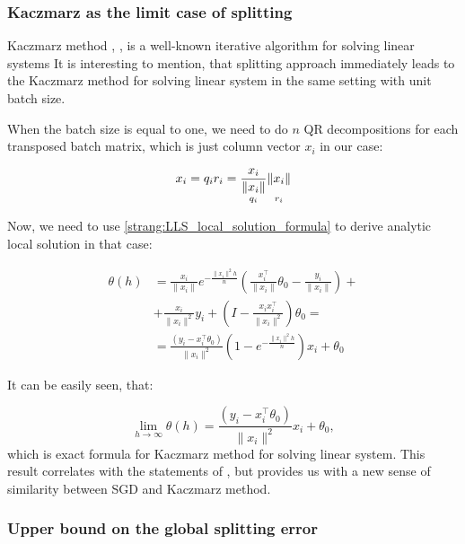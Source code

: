 \documentclass{article}
\begin{document}
\subsubsection{Kaczmarz as the limit case of splitting}
Kaczmarz method \cite{kaczmarz1937method}, \cite{strohmer2009randomized}, \cite{gower2015randomized} is a well-known iterative algorithm for solving linear systems
It is interesting to mention, that splitting approach immediately leads to the Kaczmarz method for solving linear system in the same setting with unit batch size.

When the batch size is equal to one, we need to do $n$ QR decompositions for each transposed batch matrix, which is just column vector $x_i$ in our case:

\begin{equation}
x_i = q_i r_i = \underset{q_i }{\frac{x_i}{\|x_i\|}} \underset{r_i}{\vphantom{\frac{x_i}{\|x_i\|}} \|x_i\|}
\end{equation}

Now, we need to use \eqref{strang:LLS_local_solution_formula} to derive analytic local solution in that case:

\begin{equation*}
\begin{split}
\theta(h) &= \frac{x_i}{\|x_i\|} e^{-\frac{\|x_i\|^2 h}{n}} \left( \frac{x_i^\top}{\|x_i\|} \theta_0 - \frac{y_i}{\|x_i\|}\right) + \\ &+ \frac{x_i}{\|x_i\|^2}y_i + \left(I - \frac{x_ix_i^\top}{\|x_i\|^2}\right)\theta_0 = \\
&= \frac{\left(y_i - x_i^\top\theta_0 \right)}{\|x_i\|^2}  \left(1 - e^{-\frac{\|x_i\|^2 h}{n}}\right)x_i + \theta_0
\end{split}
\end{equation*}

It can be easily seen, that:

\begin{equation}
\label{strang:splitting_limit_kaczmarz}
\lim_{h \to \infty} \theta(h) = \frac{\left(y_i - x_i^\top\theta_0 \right)}{\|x_i\|^2} x_i + \theta_0,
\end{equation}
which is exact formula for Kaczmarz method for solving linear system. This result correlates with the statements of \cite{needell2014stochastic}, but provides us with a new sense of similarity between SGD and Kaczmarz method.

\subsubsection{Upper bound on the global splitting error}
\end{document}
